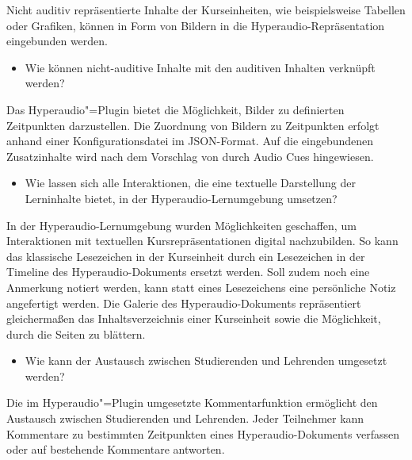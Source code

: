 Nicht auditiv repräsentierte Inhalte der Kurseinheiten, wie beispielsweise Tabellen oder Grafiken, können in Form von Bildern in die Hyperaudio-Repräsentation eingebunden werden.

\begin{itemize}
\item Wie können nicht-auditive Inhalte mit den auditiven Inhalten verknüpft werden?
\end{itemize}

Das Hyperaudio"=Plugin bietet die Möglichkeit, Bilder zu definierten Zeitpunkten darzustellen. Die Zuordnung von Bildern zu Zeitpunkten erfolgt anhand einer Konfigurationsdatei im JSON-Format. Auf die eingebundenen Zusatzinhalte wird nach dem Vorschlag von \cite{donker2007gestaltung} durch Audio Cues hingewiesen.

\begin{itemize}
\item Wie lassen sich alle Interaktionen, die eine textuelle Darstellung der Lerninhalte bietet, in der Hyperaudio-Lernumgebung umsetzen?
\end{itemize}

In der Hyperaudio-Lernumgebung wurden Möglichkeiten geschaffen, um Interaktionen mit textuellen Kursrepräsentationen digital nachzubilden. So kann das klassische Lesezeichen in der Kurseinheit durch ein Lesezeichen in der Timeline des Hyperaudio-Dokuments ersetzt werden. Soll zudem noch eine Anmerkung notiert werden, kann statt eines Lesezeichens eine persönliche Notiz angefertigt werden. Die Galerie des Hyperaudio-Dokuments repräsentiert gleichermaßen das Inhaltsverzeichnis einer Kurseinheit sowie die Möglichkeit, durch die Seiten zu blättern.

\begin{itemize}
\item Wie kann der Austausch zwischen Studierenden und Lehrenden umgesetzt werden?
\end{itemize}
Die im Hyperaudio"=Plugin umgesetzte Kommentarfunktion ermöglicht den Austausch zwischen Studierenden und Lehrenden. Jeder Teilnehmer kann Kommentare zu bestimmten Zeitpunkten eines Hyperaudio-Dokuments verfassen oder auf bestehende Kommentare antworten.

